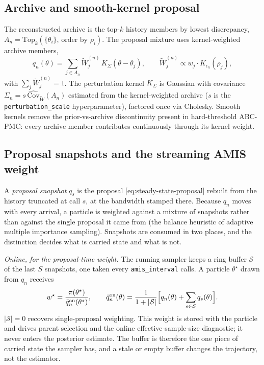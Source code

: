 \documentclass[pdflatex,sn-mathphys-num]{sn-jnl}
\theoremstyle{plain}
\theoremstyle{definition}
\begin{document}
\subsection{Archive and smooth-kernel proposal}\label{sec:method-proposal}
The reconstructed archive is the top-$k$ history members by lowest discrepancy, $A_n = \mathrm{Top}_k(\{\theta_i\},\,\text{order by }\rho_i)$. The proposal mixture uses kernel-weighted archive members,
\begin{equation}
q_n(\theta) = \sum_{j\in A_n}\tilde W_j^{(n)}\, K_\Sigma(\theta-\theta_j),
\qquad
\tilde W_j^{(n)} \propto w_j \cdot K_{\epsilon_n}(\rho_j),
\label{eq:steady-state-proposal}
\end{equation}
with $\sum_j \tilde W_j^{(n)}=1$. The perturbation kernel $K_\Sigma$ is Gaussian with covariance $\Sigma_n = s\,\widehat{\mathrm{Cov}}_{\tilde W}(A_n)$ estimated from the kernel-weighted archive ($s$ is the \texttt{perturbation\_scale} hyperparameter), factored once via Cholesky. Smooth kernels remove the prior-vs-archive discontinuity present in hard-threshold ABC-PMC: every archive member contributes continuously through its kernel weight.

\subsection{Proposal snapshots and the streaming AMIS weight}\label{sec:method-amis}
A \emph{proposal snapshot} $q_s$ is the proposal \eqref{eq:steady-state-proposal} rebuilt from the history truncated at call $s$, at the bandwidth stamped there. Because $q_n$ moves with every arrival, a particle is weighted against a mixture of snapshots rather than against the single proposal it came from (the balance heuristic of adaptive multiple importance sampling). Snapshots are consumed in two places, and the distinction decides what is carried state and what is not.

\emph{Online, for the proposal-time weight.} The running sampler keeps a ring buffer $\mathcal{S}$ of the last $S$ snapshots, one taken every \texttt{amis\_interval} calls. A particle $\theta^\star$ drawn from $q_n$ receives
\begin{equation}
w^\star = \frac{\pi(\theta^\star)}{\bar q^{\mathrm{on}}_n(\theta^\star)},
\qquad
\bar q^{\mathrm{on}}_n(\theta) = \frac{1}{1+|\mathcal{S}|}\Bigl[q_n(\theta) + \sum_{s\in\mathcal{S}} q_s(\theta)\Bigr].
\label{eq:amis-weight}
\end{equation}
$|\mathcal{S}|=0$ recovers single-proposal weighting. This weight is stored with the particle and drives parent selection and the online effective-sample-size diagnostic; it never enters the posterior estimate. The buffer is therefore the one piece of carried state the sampler has, and a stale or empty buffer changes the trajectory, not the estimator.
\end{document}
